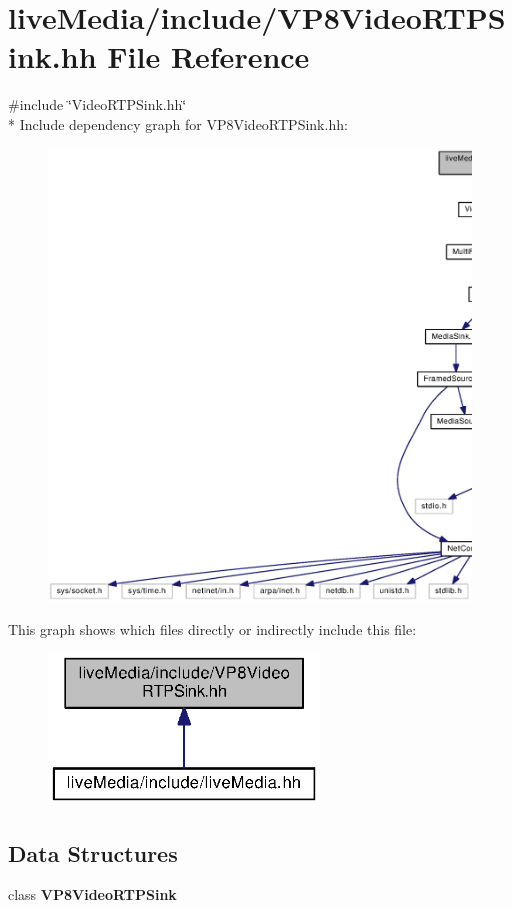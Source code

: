 \section{live\+Media/include/\+V\+P8\+Video\+R\+T\+P\+Sink.hh File Reference}
\label{VP8VideoRTPSink_8hh}
{\ttfamily \#include \char`\"{}Video\+R\+T\+P\+Sink.\+hh\char`\"{}}\\*
Include dependency graph for V\+P8\+Video\+R\+T\+P\+Sink.\+hh\+:
\nopagebreak
\begin{figure}[H]
\begin{center}
\leavevmode
\includegraphics[width=350pt]{VP8VideoRTPSink_8hh__incl}
\end{center}
\end{figure}
This graph shows which files directly or indirectly include this file\+:
\nopagebreak
\begin{figure}[H]
\begin{center}
\leavevmode
\includegraphics[width=204pt]{VP8VideoRTPSink_8hh__dep__incl}
\end{center}
\end{figure}
\subsection*{Data Structures}
\begin{DoxyCompactItemize}
\item 
class {\bf V\+P8\+Video\+R\+T\+P\+Sink}
\end{DoxyCompactItemize}
